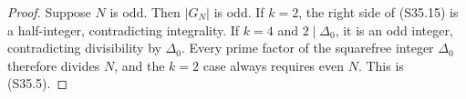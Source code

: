 \begin{proof}
Suppose \(N\) is odd. Then \(|G_N|\) is odd. If \(k=2\), the right side of (S35.15) is a half-integer, contradicting integrality. If \(k=4\) and \(2\mid\Delta_0\), it is an odd integer, contradicting divisibility by \(\Delta_0\). Every prime factor of the squarefree integer \(\Delta_0\) therefore divides \(N\), and the \(k=2\) case always requires even \(N\). This is (S35.5).
\end{proof}
